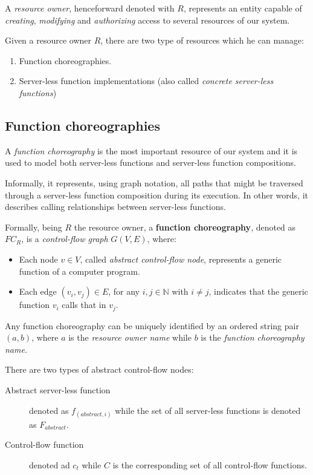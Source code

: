 \documentclass[10pt,a4paper]{article}
\theoremstyle{definition}
\begin{document}
A \textit{resource owner}, henceforward denoted with $R$, represents an entity capable of \textit{creating}, \textit{modifying} and \textit{authorizing} access to several resources of our system.

Given a resource owner $R$, there are two type of resources which he can manage:

\begin{enumerate}
\item Function choreographies.
\item Server-less function implementations (also called \textit{concrete server-less functions})
\end{enumerate}

\subsection{Function choreographies}

A \textit{function choreography} is the most important resource of our system and it is used to model both server-less functions and server-less function compositions.

Informally, it represents, using graph notation, all paths that might be traversed through a server-less function composition during its execution. In other words, it describes calling relationships between server-less functions.

Formally, being $R$ the resource owner, a \textbf{function choreography}, denoted as $FC_R$, is a \textit{control-flow graph} $G(V,E)$, where:

\begin{itemize}
\item Each node $v \in V$, called \textit{abstract control-flow node}, represents a generic function of a computer program.
\item Each edge $(v_i, v_j) \in E$, for any $i,j \in \mathbb{N}$ with $i \neq j$, indicates that the generic function $v_i$ calls that in $v_j$.
\end{itemize} 

Any function choreography can be  uniquely identified by an ordered string pair $(a, b)$, where $a$ is the \textit{resource owner name} while $b$ is the \textit{function choreography name}.

There are two types of abstract control-flow nodes:

\begin{description}
\item[Abstract server-less function] denoted as $f_{(abstract, i)}$ while the set of all server-less functions is denoted as $F_{abstract}$.
\item[Control-flow function] denoted ad $c_t$ while $C$ is the corresponding set of all control-flow functions.
\end{description}
\end{document}
